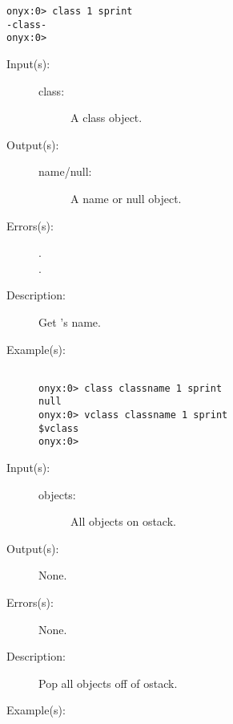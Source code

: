 \begin{description}
\begin{description}
\begin{verbatim}
onyx:0> class 1 sprint
-class-
onyx:0>
		\end{verbatim}
	\end{description}
\label{systemdict:classname}
\item[{\onyxop{class}{classname}{--}}: ]
	\begin{description}\item[]
	\item[Input(s): ]
		\begin{description}\item[]
		\item[class: ]
			A class object.
		\end{description}
	\item[Output(s): ]
		\begin{description}\item[]
		\item[name/null: ]
			A name or null object.
		\end{description}
	\item[Errors(s): ]
		\begin{description}\item[]
		\item[.]
		\item[.]
		\end{description}
	\item[Description: ]
		Get 's name.
	\item[Example(s): ]\begin{verbatim}

onyx:0> class classname 1 sprint
null
onyx:0> vclass classname 1 sprint
$vclass
onyx:0>
		\end{verbatim}
	\end{description}
\label{systemdict:clear}
\item[{\onyxop{objects}{clear}{--}}: ]
	\begin{description}\item[]
	\item[Input(s): ]
		\begin{description}\item[]
		\item[objects: ]
			All objects on ostack.
		\end{description}
	\item[Output(s): ] None.
	\item[Errors(s): ] None.
	\item[Description: ]
		Pop all objects off of ostack.
	\item[Example(s): ]\begin{verbatim}


\end{verbatim}
\end{description}
\end{description}
